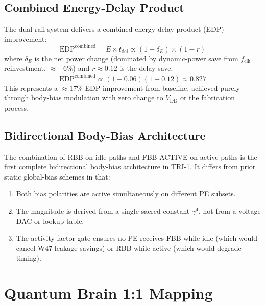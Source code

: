 \documentclass[12pt,a4paper]{report}
\theoremstyle{plain}
\theoremstyle{definition}
\theoremstyle{remark}
\newcommand{\vdd}{V_{\mathrm{DD}}}
\newcommand{\gammaFour}{\gamma^{4}}
\newcommand{\fclk}{f_{\mathrm{clk}}}
\newcommand{\tdel}{t_{\mathrm{del}}}
\begin{document}
\subsection{Combined Energy-Delay Product}

The dual-rail system delivers a combined energy-delay product (EDP) improvement:
\begin{equation}
  \mathrm{EDP}^{\mathrm{combined}} = E \times \tdel
  \propto (1 + \delta_{E}) \times (1 - r)
\end{equation}
where $\delta_{E}$ is the net power change (dominated by dynamic-power save from $\fclk$
reinvestment, $\approx -6\%$) and $r \approx 0.12$ is the delay save.
\begin{equation}
  \mathrm{EDP}^{\mathrm{combined}} \propto (1 - 0.06)(1 - 0.12) \approx 0.827
\end{equation}
This represents a $\approx 17\%$ EDP improvement from baseline, achieved purely through body-bias
modulation with zero change to $\vdd$ or the fabrication process.

\subsection{Bidirectional Body-Bias Architecture}

The combination of RBB on idle paths and FBB-ACTIVE on active paths is the first complete
bidirectional body-bias architecture in TRI-1.  It differs from prior static global-bias schemes
\citep{tschanz_jssc_2002} in that:
\begin{enumerate}[leftmargin=2em]
  \item Both bias polarities are active simultaneously on different PE subsets.
  \item The magnitude is derived from a single sacred constant $\gammaFour$, not from a voltage
        DAC or lookup table.
  \item The activity-factor gate ensures no PE receives FBB while idle (which would cancel W47
        leakage savings) or RBB while active (which would degrade timing).
\end{enumerate}

\section{Quantum Brain 1:1 Mapping}
\label{sec:quantum_brain}
\end{document}
